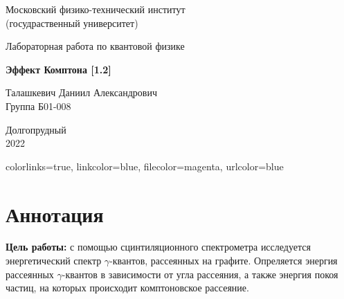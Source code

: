 \documentclass[a4paper,12pt]{article} %
\begin{document}


\begin{titlepage}

	\newpage
	\begin{center}
		\normalsize Московский физико-технический институт \\(госудраственный 			университет)
	\end{center}

	\vspace{6em}

	\begin{center}
		\Large Лабораторная работа по квантовой физике\\
	\end{center}

	\vspace{1em}

	\begin{center}
		\large \textbf{Эффект Комптона  [1.2]}
	\end{center}

	\vspace{2em}

	\begin{center}
		\large Талашкевич Даниил Александрович\\
		Группа Б01-008
	\end{center}

	\vspace{\fill}

	\begin{center}
	Долгопрудный \\2022
	\end{center}
	
\end{titlepage}

	\hypersetup
	{
		colorlinks=true,
		linkcolor=blue,
		filecolor=magenta,
		urlcolor=blue
	}


	\thispagestyle{empty}
	\newpage
	\tableofcontents
	\newpage
	\setcounter{page}{1}


\section{Аннотация}

	\textbf{Цель работы:} с помощью сцинтиляционного спектрометра исследуется энергетический спектр $\gamma$-квантов, рассеянных на графите. Опреляется энергия рассеянных $\gamma$-квантов в зависимости от угла рассеяния, а также энергия покоя частиц, на которых происходит комптоновское рассеяние.
\end{document}
